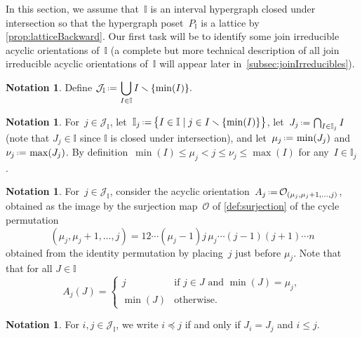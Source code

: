 \documentclass{amsart}
\theoremstyle{definition}
\newtheorem{notation}[theorem]{Notation}
\newcommand{\cal}[1]{\mathcal{#1}} %
\newcommand{\bigset}[2]{\big\{ #1 \;|\; #2 \big\}} %
\newcommand{\ssm}{\smallsetminus} %
\newcommand{\eqdef}{\mbox{\,\raisebox{0.2ex}{\scriptsize\ensuremath{\mathrm:}}\ensuremath{=}\,}} %
\newcommand{\Or}{\mathcal O}  %
\newcommand{\II}{\mathbb I} %
\newcommand{\cJ}{\cal{J}} %
\begin{document}
In this section, we assume that~$\II$ is an interval hypergraph closed under intersection so that the hypergraph poset~$P_\II$ is a lattice  by \cref{prop:latticeBackward}.
Our first task will be to identify some join irreducible acyclic orientations of~$\II$ (a complete but more technical description of all join irreducible acyclic orientations of~$\II$ will appear later in~\cref{subsec:joinIrreducibles}).

\begin{notation}
Define
\(\displaystyle
\cJ_\II \eqdef \bigcup_{I\in \II} I\ssm \{\min(I)\}.
\)
\end{notation}

\begin{notation}
For~$j \in \cJ_\II$, let~$\II_j \eqdef \bigset{I \in \II}{j \in I \ssm \{\min(I)\}}$, let~$J_j \eqdef \bigcap_{I \in \II_j} I$  (note that $J_j \in \II$ since $\II$ is closed under intersection), and let~$\mu_j \eqdef \min(J_j)$ and~$\nu_j \eqdef \max(J_j)$.
By definition~$\min(I) \le \mu_j < j \le \nu_j \le \max(I)$ for any~$I \in \II_j$.
\end{notation}

\begin{notation}
For~$j \in \cJ_\II$, consider the acyclic orientation~$A_j \eqdef \Or_{(\mu_j, \mu_j+1, \ldots, j)}$, obtained as the image by the surjection map~$\Or$ of \cref{def:surjection} of the cycle permutation
\[
(\mu_j, \mu_j+1, \dots, j) = 12 \cdots (\mu_j-1)j\,\mu_j \cdots (j-1) (j+1) \cdots n
\]
obtained from the identity permutation by placing~$j$ just before $\mu_j$.
Note that that for all $J \in \II$
\[
A_j(J) =
\begin{cases}
	j & \text{if } j \in J \text{ and } \min(J)=\mu_j,\\
	\min(J) & \text{otherwise.}
\end{cases}
\]
\end{notation}

\begin{notation}
For $i,j \in \cJ_\II$, we write $i \preccurlyeq j$ if and only if $J_i = J_j$ and $i \le j$.
\end{notation}
\end{document}
